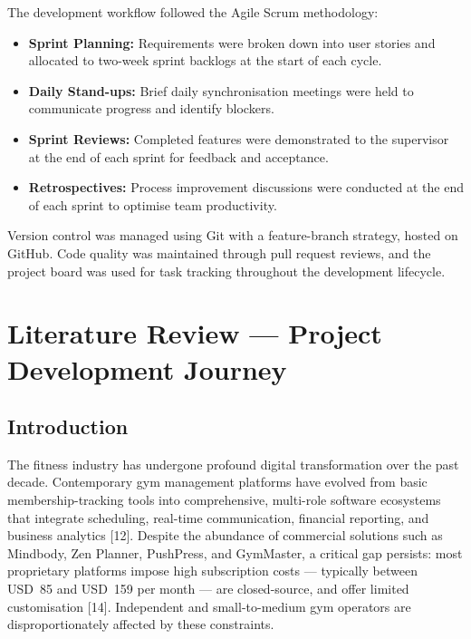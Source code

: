 \documentclass[
  12pt,
  a4paperpaper,
]{report}
\providecommand{\tightlist}{%
  \setlength{\itemsep}{0pt}\setlength{\parskip}{0pt}\setlength{\topsep}{2pt}\setlength{\partopsep}{0pt}}
\begin{document}
The development workflow followed the Agile Scrum methodology:

\begin{itemize}
\tightlist
\item
  \textbf{Sprint Planning:} Requirements were broken down into user
  stories and allocated to two-week sprint backlogs at the start of each
  cycle.
\item
  \textbf{Daily Stand-ups:} Brief daily synchronisation meetings were
  held to communicate progress and identify blockers.
\item
  \textbf{Sprint Reviews:} Completed features were demonstrated to the
  supervisor at the end of each sprint for feedback and acceptance.
\item
  \textbf{Retrospectives:} Process improvement discussions were
  conducted at the end of each sprint to optimise team productivity.
\end{itemize}

Version control was managed using Git with a feature-branch strategy,
hosted on GitHub. Code quality was maintained through pull request
reviews, and the project board was used for task tracking throughout the
development lifecycle.



\chapter{Literature Review --- Project Development
Journey}\label{literature-review---project-development-journey}


\section{Introduction}\label{introduction-1}

The fitness industry has undergone profound digital transformation over
the past decade. Contemporary gym management platforms have evolved from
basic membership-tracking tools into comprehensive, multi-role software
ecosystems that integrate scheduling, real-time communication,
financial reporting, and business analytics {[}12{]}. Despite
the abundance of commercial solutions such as Mindbody, Zen Planner,
PushPress, and GymMaster, a critical gap persists: most proprietary
platforms impose high subscription costs --- typically between USD~85
and USD~159 per month --- are closed-source, and offer limited
customisation {[}14{]}. Independent and small-to-medium
gym operators are disproportionately affected by these constraints.
\end{document}
